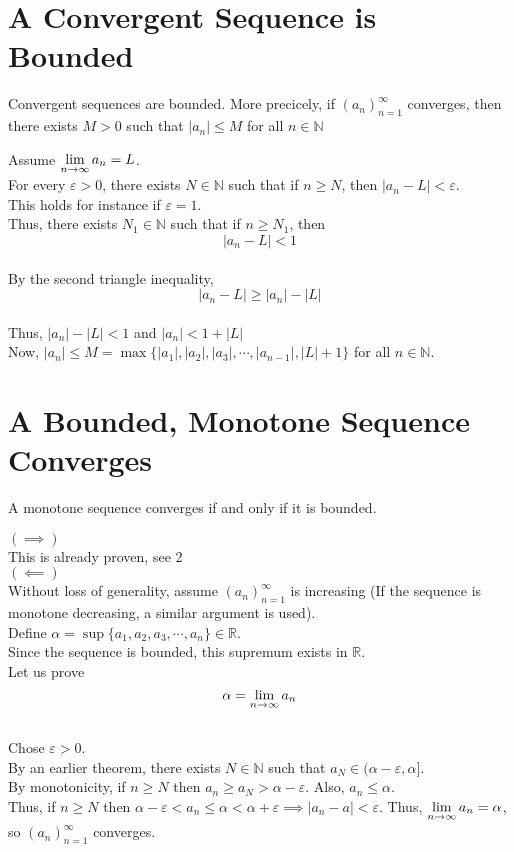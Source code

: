 \documentclass[12pt]{article}
\begin{document}
\section{A Convergent Sequence is Bounded}
\begin{theo}{}
    Convergent sequences are bounded. More precicely, if $(a_n)_{n=1}^\infty$ converges, then there exists $M > 0$ such that $|a_n| \le M$ for all $n \in \mathbb N$\\
\end{theo}
\begin{prf}{}
    Assume $\displaystyle\lim_{n\to\infty}{a_n} = L$.\\
For every $\varepsilon > 0$, there exists $N \in \mathbb N$ such that if $n \ge N$, then $|a_n - L| < \varepsilon$.\\
This holds for instance if $\varepsilon = 1$.\\
Thus, there exists $N_1 \in \mathbb N$ such that if $n \ge N_1$, then $$|a_n - L| < 1$$\\
By the second triangle inequality, $$|a_n - L| \ge |a_n| - |L|$$\\
Thus, $|a_n| - |L| < 1$ and $|a_n| < 1 + |L|$ \\
Now, $|a_n| \le M = \max\{|a_1|, |a_2|, |a_3|, \cdots, |a_{n-1}|, |L| + 1\}$ for all $n \in \mathbb N$.
\end{prf}

\section{A Bounded, Monotone Sequence Converges}
\begin{theo}{}
    A monotone sequence converges if and only if it is bounded.
\end{theo}
\begin{prf}{}
    $\left(\implies\right)$\\ This is already proven, see 2\\
$\left(\impliedby\right)$\\ Without loss of generality, assume $(a_n)_{n=1}^\infty$ is increasing (If the sequence is monotone decreasing, a similar argument is used).\\ Define $\alpha = \sup\{a_1, a_2, a_3, \cdots, a_n\} \in \mathbb R$.\\ Since the sequence is bounded, this supremum exists in $\mathbb R$. \\
Let us prove $$\alpha = \displaystyle\lim_{n\to\infty}{a_n}$$ \\ Chose $\varepsilon > 0$. \\By an earlier theorem, there exists $N \in \mathbb N$ such that $a_N \in (\alpha - \varepsilon, \alpha]$.\\ By monotonicity, if $n\ge N$ then $a_n \ge a_N > \alpha - \varepsilon$. Also, $a_n \le \alpha$. \\ Thus, if $n \ge N$ then $\alpha - \varepsilon < a_n \le \alpha < \alpha + \varepsilon \implies |a_n - a| < \varepsilon$. Thus, $\displaystyle\lim_{n\to \infty}{a_n} = \alpha$, so $(a_n)_{n=1}^\infty$ converges.\\
\end{prf}
\end{document}
